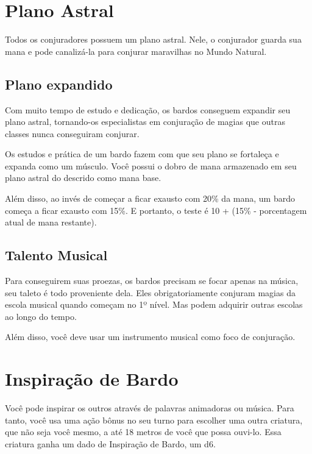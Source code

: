\begin{multicols}{2}

\section*{Plano Astral}%

Todos os conjuradores possuem um plano astral. Nele, o conjurador guarda sua
mana e pode canalizá-la para conjurar maravilhas no Mundo Natural.

\subsection*{Plano expandido}%

Com muito tempo de estudo e dedicação, os bardos conseguem expandir seu plano
astral, tornando-os especialistas em conjuração de magias que outras classes
nunca conseguiram conjurar.

Os estudos e prática de um bardo fazem com que seu plano se fortaleça e expanda
como um músculo. Você possui o dobro de mana armazenado em seu plano astral do
descrido como mana base.

Além disso, ao invés de começar a ficar exausto com 20\% da mana, um bardo
começa a ficar exausto com 15\%. E portanto, o teste é 10 + (15\% - porcentagem
atual de mana restante).

\subsection*{Talento Musical}%

Para conseguirem suas proezas, os bardos precisam se focar apenas na música, seu
taleto é todo proveniente dela. Eles obrigatoriamente conjuram magias da escola
musical quando começam no 1º nível. Mas podem adquirir outras escolas ao longo
do tempo.

Além disso, você deve usar um instrumento musical como foco de conjuração.

\section*{Inspiração de Bardo}

Você pode inspirar os outros através de palavras animadoras ou música. Para
tanto, você usa uma ação bônus no seu turno para escolher uma outra criatura,
que não seja você mesmo, a até 18 metros de você que possa ouvi-lo. Essa
criatura ganha um dado de Inspiração de Bardo, um d6.


\end{multicols}
